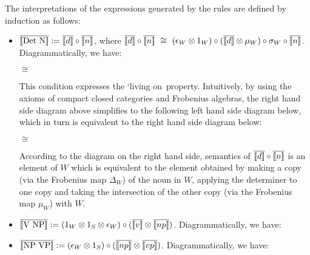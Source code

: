 \bigskip
The  interpretations of the expressions  generated by the rules are defined  by induction as follows:




\begin{itemize}
\item  $\overline{[\![ \mbox{Det N} ]\!]} := \overline{[\![ d ]\!]} \circ \overline{[\![ n ]\!]}$, where  $
\overline{\semantics{d}} \circ \overline{\semantics{n}} \ \cong \ (\epsilon_W \otimes 1_W) \circ (\overline{\semantics{d}} \otimes \mu_W) \circ \sigma_W \circ \overline{\semantics{n}}$. Diagrammatically, we have:

\begin{center}
 \qquad $\cong$ \qquad {}  
\end{center}

\noindent
This condition expresses the `living on\ property.  Intuitively,  by using the axioms of compact closed categories and Frobenius algebras,  the right hand side diagram above simplifies to the following left hand side diagram below, which in turn is equivalent to the right hand side diagram below:

\begin{center}
  \qquad $\cong$ \qquad  {} 
 \end{center}
 
 \noindent
 According to the  diagram on the right hand side, semantics of  $\overline{[\![ d ]\!]} \circ \overline{[\![ n ]\!]}$ is an element of $W$ which is equivalent to the element obtained by making a copy (via the Frobenius map $\Delta_W$) of the noun  in $W$,  applying the determiner  to one copy and taking the intersection of the other copy (via the Frobenius map $\mu_W$) with $W$. 
 

\item $\overline{[\![ \mbox{V NP} ]\!]} := (1_W \otimes 1_S \otimes \epsilon_W) \circ (\overline{[\![ v ]\!]} \otimes \overline{[\![ np ]\!]})$. Diagrammatically, we have:

\begin{center}
\end{center}

\item $\overline{[\![ \mbox{NP VP} ]\!]} := (\epsilon_W \otimes 1_S) \circ (\overline{[\![ np ]\!]} \otimes \overline{[\![ vp ]\!]})$. Diagrammatically, we have:

\begin{center}
\end{center}
\end{itemize}


